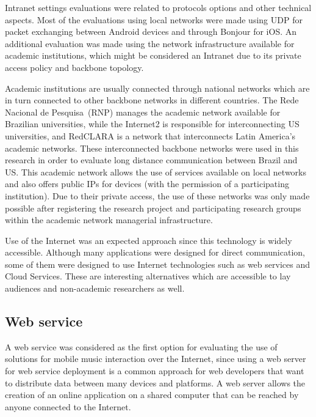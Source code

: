Intranet settings evaluations were related to protocols options and other technical aspects.
Most of the evaluations using local networks were made using UDP for packet exchanging between Android devices and through Bonjour for iOS.
An additional evaluation was made using the network infrastructure available for academic institutions, which might be considered an Intranet due to its private access policy and backbone topology.

Academic institutions are usually connected through national networks which are in turn connected to other backbone networks in different countries.
The Rede Nacional de Pesquisa~(RNP) manages the academic network available for Brazilian universities, while the Internet2 is responsible for interconnecting US universities, and RedCLARA is a network that interconnects Latin America's academic networks.
These interconnected backbone networks were used in this research in order to evaluate long distance communication between Brazil and US.
This academic network allows the use of services available on local networks and also offers public IPs for devices (with the permission of a participating institution).
Due to their private access, the use of these networks was only made possible after registering the research project and participating research groups within the academic network managerial infrastructure.

Use of the Internet was an expected approach since this technology is widely accessible.
Although many applications were designed for direct communication, some of them were designed to use Internet technologies such as web services and Cloud Services. These are interesting alternatives which are accessible to lay audiences and non-academic researchers as well.

\subsection*{Web service}
 
A web service was considered as the first option for evaluating the use of solutions for mobile music interaction over the Internet, since
using a web server for web service deployment is a common approach for web developers that want to distribute data between many devices and platforms.
A web server allows the creation of an online application on a shared computer that can be reached by anyone connected to the Internet.

